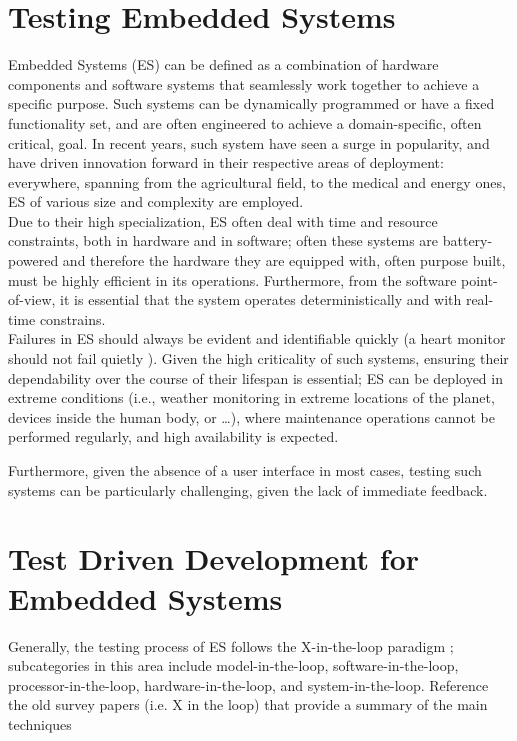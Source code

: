 \section{Testing Embedded Systems}
Embedded Systems (ES) can be defined as a combination of hardware components and software systems that seamlessly work together to achieve a specific purpose. Such systems can be dynamically programmed or have a fixed functionality set, and are often engineered to achieve a domain-specific, often critical, goal.
In recent years, such system have seen a surge in popularity, and have driven innovation forward in their respective areas of deployment: everywhere, spanning from the agricultural field, to the medical and energy ones, ES of various size and complexity are employed. \\
Due to their high specialization, ES often deal with time and resource constraints, both in hardware and in software; often these systems are battery-powered and therefore the hardware they are equipped with, often purpose built, must be highly efficient in its operations. Furthermore, from the software point-of-view, it is essential that the system operates deterministically and with real-time constrains. \\
Failures in ES should always be evident and identifiable quickly (a heart monitor should not fail quietly \cite{MakingEmbeddedSystems}). Given the high criticality of such systems, ensuring their dependability over the course of their lifespan is essential; ES can be deployed in extreme conditions (i.e., weather monitoring in extreme locations of the planet, devices inside the human body, or \dots), where maintenance operations cannot be performed regularly,  and high availability is expected. 




Furthermore, given the absence of a user interface in most cases, testing such systems can be particularly challenging, given the lack of immediate feedback.


\section{Test Driven Development for Embedded Systems}
Generally, the testing process of ES follows the X-in-the-loop paradigm \cite{DBLP:journals/software/GarousiFKY18}; subcategories in this area include model-in-the-loop, software-in-the-loop, processor-in-the-loop, hardware-in-the-loop, and system-in-the-loop.
Reference the old survey papers (i.e. X in the loop) that provide a summary of the main techniques